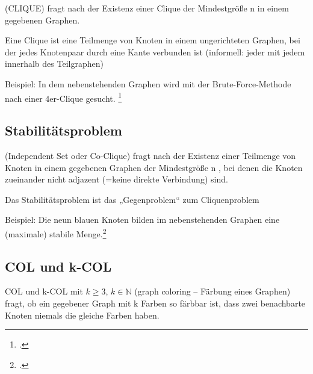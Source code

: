 \documentclass{lehramt-informatik-haupt}
\begin{document}
(CLIQUE) fragt nach der Existenz einer Clique der Mindestgröße n in
einem gegebenen Graphen.

Eine Clique ist eine Teilmenge von Knoten in einem ungerichteten
Graphen, bei der jedes Knotenpaar durch eine Kante verbunden ist
(informell: jeder mit jedem innerhalb des Teilgraphen)

Beispiel: In dem nebenstehenden Graphen wird mit der Brute-Force-Methode
nach einer 4er-Clique gesucht.
\footcite[Seite 76]{theo:fs:4}

%

\subsection{Stabilitätsproblem}

(Independent Set oder Co-Clique) fragt nach der Existenz einer Teilmenge
von Knoten in einem gegebenen Graphen der Mindestgröße n , bei denen die
Knoten zueinander nicht adjazent (=keine direkte Verbindung) sind.

Das Stabilitätsproblem ist das „Gegenproblem“ zum Cliquenproblem

Beispiel: Die neun blauen Knoten bilden im nebenstehenden Graphen eine
(maximale) stabile Menge.\footcite[Seite 77]{theo:fs:4}

%

\subsection{COL und k-COL}

COL und k-COL mit $k \geq 3$, $k \in \mathbb{N}$ (graph coloring –
Färbung eines Graphen) fragt, ob ein gegebener Graph mit k Farben so
färbbar ist, dass zwei benachbarte Knoten niemals die gleiche Farben
haben.

\literatur
\end{document}

